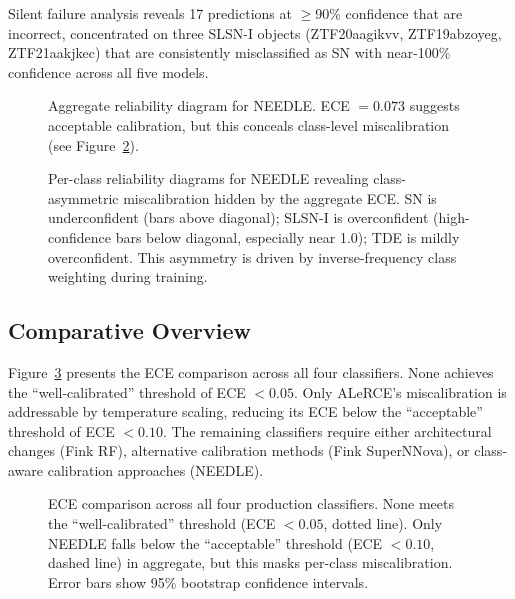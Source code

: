 \documentclass[twocolumn]{aastex631}
\begin{document}
Silent failure analysis reveals 17 predictions at $\geq$90\% confidence that are incorrect, concentrated on three SLSN-I objects (ZTF20aagikvv, ZTF19abzoyeg, ZTF21aakjkec) that are consistently misclassified as SN with near-100\% confidence across all five models.

\begin{figure}
\caption{Aggregate reliability diagram for NEEDLE. ECE $= 0.073$ suggests acceptable calibration, but this conceals class-level miscalibration (see Figure~\ref{fig:needle_perclass}). \label{fig:needle_aggregate}}
\end{figure}

\begin{figure}
\caption{Per-class reliability diagrams for NEEDLE revealing class-asymmetric miscalibration hidden by the aggregate ECE. SN is underconfident (bars above diagonal); SLSN-I is overconfident (high-confidence bars below diagonal, especially near 1.0); TDE is mildly overconfident. This asymmetry is driven by inverse-frequency class weighting during training. \label{fig:needle_perclass}}
\end{figure}

\subsection{Comparative Overview}

Figure~\ref{fig:summary} presents the ECE comparison across all four classifiers. None achieves the ``well-calibrated'' threshold of ECE $< 0.05$. Only ALeRCE's miscalibration is addressable by temperature scaling, reducing its ECE below the ``acceptable'' threshold of ECE $< 0.10$. The remaining classifiers require either architectural changes (Fink RF), alternative calibration methods (Fink SuperNNova), or class-aware calibration approaches (NEEDLE).

\begin{figure}
\caption{ECE comparison across all four production classifiers. None meets the ``well-calibrated'' threshold (ECE $< 0.05$, dotted line). Only NEEDLE falls below the ``acceptable'' threshold (ECE $< 0.10$, dashed line) in aggregate, but this masks per-class miscalibration. Error bars show 95\% bootstrap confidence intervals. \label{fig:summary}}
\end{figure}


\end{document}
